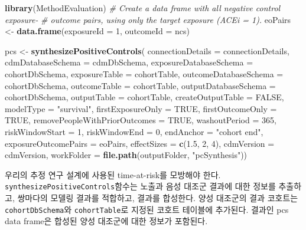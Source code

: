 \documentclass[11pt]{book}
\newenvironment{Shaded}{\begin{snugshade}}{\end{snugshade}}
\newcommand{\KeywordTok}[1]{\textcolor[rgb]{0.13,0.29,0.53}{\textbf{#1}}}
\newcommand{\DataTypeTok}[1]{\textcolor[rgb]{0.13,0.29,0.53}{#1}}
\newcommand{\DecValTok}[1]{\textcolor[rgb]{0.00,0.00,0.81}{#1}}
\newcommand{\FloatTok}[1]{\textcolor[rgb]{0.00,0.00,0.81}{#1}}
\newcommand{\StringTok}[1]{\textcolor[rgb]{0.31,0.60,0.02}{#1}}
\newcommand{\CommentTok}[1]{\textcolor[rgb]{0.56,0.35,0.01}{\textit{#1}}}
\newcommand{\OtherTok}[1]{\textcolor[rgb]{0.56,0.35,0.01}{#1}}
\newcommand{\NormalTok}[1]{#1}
\theoremstyle{definition}
\theoremstyle{definition}
\theoremstyle{definition}
\theoremstyle{remark}
\begin{document}
\begin{Shaded}
\begin{Highlighting}[]
\KeywordTok{library}\NormalTok{(MethodEvaluation)}
\CommentTok{# Create a data frame with all negative control exposure-}
\CommentTok{# outcome pairs, using only the target exposure (ACEi = 1).}
\NormalTok{eoPairs <-}\StringTok{ }\KeywordTok{data.frame}\NormalTok{(}\DataTypeTok{exposureId =} \DecValTok{1}\NormalTok{,}
                      \DataTypeTok{outcomeId =}\NormalTok{ ncs)}

\NormalTok{pcs <-}\StringTok{ }\KeywordTok{synthesizePositiveControls}\NormalTok{(}
  \DataTypeTok{connectionDetails =}\NormalTok{ connectionDetails,}
  \DataTypeTok{cdmDatabaseSchema =}\NormalTok{ cdmDbSchema,}
  \DataTypeTok{exposureDatabaseSchema =}\NormalTok{ cohortDbSchema,}
  \DataTypeTok{exposureTable =}\NormalTok{ cohortTable,}
  \DataTypeTok{outcomeDatabaseSchema =}\NormalTok{ cohortDbSchema,}
  \DataTypeTok{outcomeTable =}\NormalTok{ cohortTable,}
  \DataTypeTok{outputDatabaseSchema =}\NormalTok{ cohortDbSchema,}
  \DataTypeTok{outputTable =}\NormalTok{ cohortTable,}
  \DataTypeTok{createOutputTable =} \OtherTok{FALSE}\NormalTok{,}
  \DataTypeTok{modelType =} \StringTok{"survival"}\NormalTok{,}
  \DataTypeTok{firstExposureOnly =} \OtherTok{TRUE}\NormalTok{,}
  \DataTypeTok{firstOutcomeOnly =} \OtherTok{TRUE}\NormalTok{,}
  \DataTypeTok{removePeopleWithPriorOutcomes =} \OtherTok{TRUE}\NormalTok{,}
  \DataTypeTok{washoutPeriod =} \DecValTok{365}\NormalTok{,}
  \DataTypeTok{riskWindowStart =} \DecValTok{1}\NormalTok{,}
  \DataTypeTok{riskWindowEnd =} \DecValTok{0}\NormalTok{,}
  \DataTypeTok{endAnchor =} \StringTok{"cohort end"}\NormalTok{,}
  \DataTypeTok{exposureOutcomePairs =}\NormalTok{ eoPairs,}
  \DataTypeTok{effectSizes =} \KeywordTok{c}\NormalTok{(}\FloatTok{1.5}\NormalTok{, }\DecValTok{2}\NormalTok{, }\DecValTok{4}\NormalTok{),}
  \DataTypeTok{cdmVersion =}\NormalTok{ cdmVersion,}
  \DataTypeTok{workFolder =} \KeywordTok{file.path}\NormalTok{(outputFolder, }\StringTok{"pcSynthesis"}\NormalTok{))}
\end{Highlighting}
\end{Shaded}

우리의 추정 연구 설계에 사용된 time-at-risk를 모방해야 한다.
\texttt{synthesizePositiveControls}함수는 노출과 음성 대조군 결과에 대한
정보를 추출하고, 쌍마다의 모델링 결과를 적합하고, 결과를 합성한다. 양성
대조군의 결과 코호트는 \texttt{cohortDbSchema}와 \texttt{cohortTable}로
지정된 코호트 테이블에 추가된다. 결과인 pcs data frame은 합성된 양성
대조군에 대한 정보가 포함된다.
\end{document}
